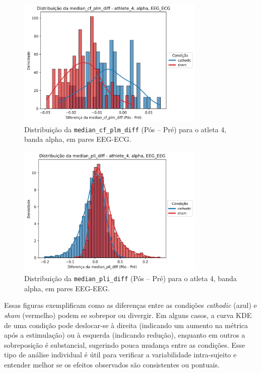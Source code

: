 \begin{figure}[htb]
    \centering
    \includegraphics[width=0.8\textwidth]{figs/5_connectivity_metrics_individual_distribution/median_cf_plm_diff_athlete_4_alpha_EEG_ECG.png}
    \caption{Distribuição da \texttt{median\_cf\_plm\_diff} (Pós -- Pré) para o atleta 4, banda alpha, em pares EEG-ECG.}
    \label{fig:median_cf_plm_diff_ath4_alpha_eeg_ecg}
\end{figure}

\begin{figure}[htb]
    \centering
    \includegraphics[width=0.8\textwidth]{figs/5_connectivity_metrics_individual_distribution/median_pli_diff_athlete_4_alpha_EEG_EEG.png}
    \caption{Distribuição da \texttt{median\_pli\_diff} (Pós -- Pré) para o atleta 4, banda alpha, em pares EEG-EEG.}
    \label{fig:median_pli_diff_ath4_alpha_eeg_eeg}
\end{figure}

Essas figuras exemplificam como as diferenças entre as condições \emph{cathodic} (azul) e \emph{sham} (vermelho) podem se sobrepor ou divergir. Em alguns casos, a curva KDE de uma condição pode deslocar-se à direita (indicando um aumento na métrica após a estimulação) ou à esquerda (indicando redução), enquanto em outros a sobreposição é substancial, sugerindo pouca mudança entre as condições. Esse tipo de análise individual é útil para verificar a variabilidade intra-sujeito e entender melhor se os efeitos observados são consistentes ou pontuais.

